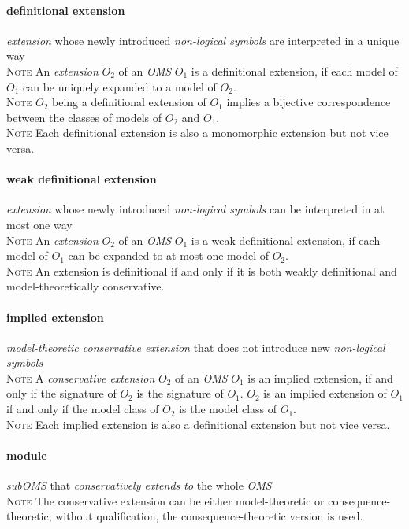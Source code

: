 \documentclass[10pt,%
\ifpretendfinal
final%
\else
draft%
\fi,
]{scrreprt}
\makeatletter
\newcommand*\CommentAuthor{}
\renewcommand*\CommentAuthor{#1}}
\newcommand*\CommentDate{}
\renewcommand*\CommentDate{#1}}
\newcommand*\CommentId{}
\renewcommand*\CommentId{#1}}
\newcommand*\CommentType{}
\renewcommand*\CommentType{#1}}
\newcommand*{\SetCommentColorByType}[1]{%
\edef\localType{{#1}}%
\expandafter\ifstrequal\localType{q-aut}{\colorlet{CommentColor}{red}}{%
\expandafter\ifstrequal\localType{q-all}{\colorlet{CommentColor}{orange}}{%
\expandafter\ifstrequal\localType{todo}{\colorlet{CommentColor}{orange}}{%
\expandafter\ifstrequal\localType{fyi}{\colorlet{CommentColor}{lightgray}}{%
\colorlet{CommentColor}{yellow}}}}}}
\newcommand*{\SetCommentPrefixByType}[1]{%
\edef\localType{{#1}}%
\expandafter\@ifmtarg\localType{%
\edef\CommentPrefix{}%
}{%
\caseupper[q]{#1}%
\edef\CommentPrefix{\thestring: }%
}}
\newcommand*{\initComment}[1]{%
\setkeys{Comment}{#1}%
\SetCommentColorByType{\CommentType}%
\relax%
\SetCommentPrefixByType{\CommentType}%
\relax%
}
\newcommand*{\todonote}[2][]{%
\initComment{#1}%
\pdfcomment[author=\CommentAuthor,color=CommentColor,date=\CommentDate,id=\CommentId]{%
\CommentPrefix
#2}}
\newcommand*{\todonoteURL}[1]{#1}
\renewcommand*{\todonote}[2][]{%
\initComment{#1}%
\ednote{\CommentPrefix #2}}
\renewcommand*{\todonoteURL}[1]{\url{#1}}
\newcommand*{\termref}[1]{\textit{#1}}
\newcommand{\termdefinition}[2]{\paragraph{#1} #2}
\newenvironment{definitions}[0]{\medskip }{}
\newenvironment{note}[0]{\ \\ \textsc{Note} \quad}{}
\makeatother
\begin{document}
\begin{definitions}
  \termdefinition{definitional extension}{\termref{extension} whose newly introduced
   \termref{non-logical symbols} are interpreted in a unique way}
  \begin{note}
An \termref{extension} $O_2$ of an \termref{OMS} $O_1$ is a definitional extension, if each model of $O_1$ can be uniquely expanded to a model of $O_2$.
  \end{note}
  \begin{note}
    $O_2$ being a definitional extension of $O_1$ implies a bijective correspondence between the classes of models of $O_2$ and $O_1$.
  \end{note}
  \begin{note}
    Each definitional extension is also a monomorphic extension but not vice versa.
  \end{note}

  \termdefinition{weak definitional extension}{\termref{extension} whose newly introduced
   \termref{non-logical symbols} can be interpreted in at most one way}
  \begin{note}
An \termref{extension} $O_2$ of an \termref{OMS} $O_1$ is a weak definitional extension, if each model of $O_1$ can be expanded to at most one model of $O_2$.
  \end{note}
  \begin{note}
    An extension is definitional if and only if it is both weakly definitional
   and model-theoretically conservative.
  \end{note}

  \termdefinition{implied extension}{\termref{model-theoretic conservative extension} that does not introduce new \termref{non-logical symbols}}
  \begin{note}
    A \termref{conservative extension} $O_2$ of an \termref{OMS}
    $O_1$ is an implied extension, if and only if the signature of
    $O_2$ is the signature of $O_1$.  $O_2$ is an implied extension of
    $O_1$ if and only if the model class of $O_2$ is the model class
    of $O_1$.
  \end{note}
  \begin{note}
    Each implied extension is also a definitional extension but not vice versa.
  \end{note}

  \termdefinition{module}{\termref{subOMS} that \termref{conservatively extends to} the whole \termref{OMS}}
  \begin{note}
    The conservative extension can be either model-theoretic or consequence-theoretic; without qualification, the consequence-theoretic version is used.
  \end{note}


\end{definitions}
\end{document}
